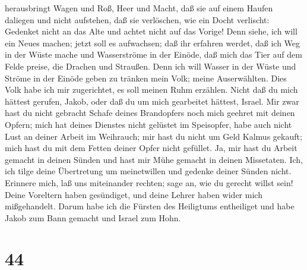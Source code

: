 herausbringt Wagen und Roß, Heer und Macht, daß sie auf einem Haufen
daliegen und nicht aufstehen, daß sie verlöschen, wie ein Docht
verlischt:  Gedenket nicht an das Alte und achtet nicht auf
das Vorige!  Denn siehe, ich will ein Neues machen; jetzt
soll es aufwachsen; daß ihr erfahren werdet, daß ich Weg in der Wüste
mache und Wasserströme in der Einöde,  daß mich das Tier
auf dem Felde preise, die Drachen und Straußen. Denn ich will Wasser in
der Wüste und Ströme in der Einöde geben zu tränken mein Volk; meine
Auserwählten.  Dies Volk habe ich mir zugerichtet, es soll
meinen Ruhm erzählen.  Nicht daß du mich hättest gerufen,
Jakob, oder daß du um mich gearbeitet hättest, Israel.  Mir
zwar hast du nicht gebracht Schafe deines Brandopfers noch mich geehret
mit deinen Opfern; mich hat deines Dienstes nicht gelüstet im
Speisopfer, habe auch nicht Lust an deiner Arbeit im Weihrauch;
 mir hast du nicht um Geld Kalmus gekauft; mich hast du mit
dem Fetten deiner Opfer nicht gefüllet. Ja, mir hast du Arbeit gemacht
in deinen Sünden und hast mir Mühe gemacht in deinen Missetaten.
 Ich, ich tilge deine Übertretung um meinetwillen und
gedenke deiner Sünden nicht.  Erinnere mich, laß uns
miteinander rechten; sage an, wie du gerecht willst sein! 
Deine Voreltern haben gesündiget, und deine Lehrer haben wider mich
mißgehandelt.  Darum habe ich die Fürsten des Heiligtums
entheiliget und habe Jakob zum Bann gemacht und Israel zum Hohn.

\hypertarget{section-43}{%
\section{44}\label{section-43}}

